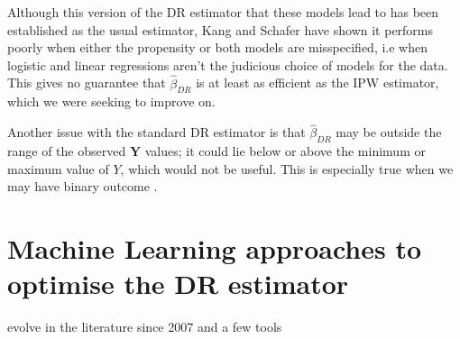 \documentclass[12pt,twoside]{article}
\begin{document}
Although this version of the DR estimator that these models lead to has been established as the usual estimator, Kang and Schafer \cite{kang} have shown it performs poorly when either the propensity or both models are misspecified, i.e when logistic and linear regressions aren't the judicious choice of models for the data. This gives no guarantee that $\hat\beta_{DR}$ is at least as efficient as the IPW estimator, which we were seeking to improve on.

Another issue with the standard DR estimator is that $\hat\beta_{DR}$ may be outside the range of the observed $\mathbf{Y}$ values; it could lie below or above the minimum or maximum value of $Y$, which would not be useful. This is especially true when we may have binary outcome \cite{vansteelandt}.

\section{Machine Learning approaches to optimise the DR estimator}

evolve in the literature since 2007
and a few tools





\end{document}
